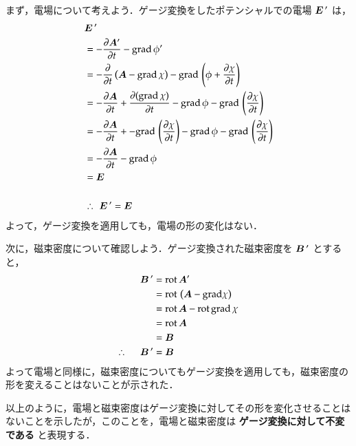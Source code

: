             まず，電場について考えよう．ゲージ変換をしたポテンシャルでの電場 $\boldsymbol{E}\,'$ は，
                    \begin{align}
                            &\boldsymbol{E}\,' \notag \\
                            &=-\displaystyle \frac{\partial\boldsymbol{A}'}{\partial t}-\mathrm{grad\,}\phi ' \notag \\
                            &=-\frac{\partial}{\partial t}\left( \boldsymbol{A}-\mathrm{grad}\,\chi \right)
                            -\mathrm{grad}\,\left( \phi+\frac{\partial \chi}{\partial t} \right) \notag \\
                            &=-\frac{\partial  \boldsymbol{A}}{\partial t}+\frac{\partial  (\mathrm{grad}\,\chi)}{\partial t}
                            -\mathrm{grad}\,\phi-\mathrm{grad}\,\left( \frac{\partial \chi}{\partial t} \right) \notag \\
                            &=-\frac{\partial  \boldsymbol{A}}{\partial t}+-\mathrm{grad}\,\left( \frac{\partial \chi}{\partial t} \right)
                            -\mathrm{grad}\,\phi-\mathrm{grad}\,\left( \frac{\partial \chi}{\partial t} \right) \notag \\
                            &=-\frac{\partial  \boldsymbol{A}}{\partial t}-\mathrm{grad}\,\phi \notag \\
                            &=\boldsymbol{E}\notag \\ \notag \\
                            &\therefore\,\,\boldsymbol{E}\,'=\boldsymbol{E}
                    \end{align}
            よって，ゲージ変換を適用しても，電場の形の変化はない．

            次に，磁束密度について確認しよう．ゲージ変換された磁束密度を $\boldsymbol{B}\,'$ とすると，
                    \begin{align}
                    \boldsymbol{B}\,'&=\mathrm{rot}\,\boldsymbol{A}' \notag \\
                    &=\mathrm{rot}\,\left(\boldsymbol{A}-\mathrm{grad \chi} \right)\notag \\
                    &=\mathrm{rot}\,\boldsymbol{A}-\mathrm{rot\,grad} \,\chi\notag \\
                    &=\mathrm{rot}\,\boldsymbol{A}\notag \\
                    &=\boldsymbol{B}\notag \\
                    \therefore\,\quad\,
                    \boldsymbol{B}\,'&=\boldsymbol{B}
                    \end{align}
            よって電場と同様に，磁束密度についてもゲージ変換を適用しても，磁束密度の形を変えることはないことが示された．

            以上のように，電場と磁束密度はゲージ変換に対してその形を変化させることは
            ないことを示したが，このことを，電場と磁束密度は \textbf{ゲージ変換に対して不変である} と表現する．

